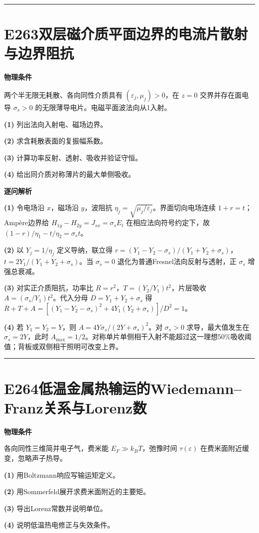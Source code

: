 \documentclass[UTF8,a4paper,11pt,oneside,openany]{ctexbook}
\begin{document}
\par\bigskip\hrule\bigskip
\section*{E263\quad 双层磁介质平面边界的电流片散射与边界阻抗}
\textbf{物理条件}\par 两个半无限无耗散、各向同性介质具有 \((\varepsilon_j,\mu_j)>0\)，在 \(z=0\) 交界并存在面电导 \(\sigma_s>0\) 的无限薄导电片。电磁平面波法向从1入射。
\par\noindent\textbf{(1)} 列出法向入射电、磁场边界。
\par\noindent\textbf{(2)} 求含耗散表面的复振幅系数。
\par\noindent\textbf{(3)} 计算功率反射、透射、吸收并验证守恒。
\par\noindent\textbf{(4)} 给出同介质对称薄片的最大单侧吸收。

\par\medskip\noindent\textbf{逐问解析}
\par\noindent\textbf{(1)} 令电场沿 \(x\)，磁场沿 \(y\)，波阻抗 \(\eta_j=\sqrt{\mu_j/\varepsilon_j}\)。界面切向电场连续 \(1+r=t\)；Ampère边界给 \(H_{1y}-H_{2y}=J_{sx}=\sigma_sE_t\) 在相应法向符号约定下，故 \((1-r)/\eta_1-t/\eta_2=\sigma_st\)。
\par\noindent\textbf{(2)} 以 \(Y_j=1/\eta_j\) 定义导纳，联立得 \(r=(Y_1-Y_2-\sigma_s)/(Y_1+Y_2+\sigma_s)\)，\(t=2Y_1/(Y_1+Y_2+\sigma_s)\)。当 \(\sigma_s=0\) 退化为普通Fresnel法向反射与透射，正 \(\sigma_s\) 增强总衰减。
\par\noindent\textbf{(3)} 对实正介质阻抗，功率比 \(R=r^2\)，\(T=(Y_2/Y_1)t^2\)，片层吸收 \(A=(\sigma_s/Y_1)t^2\)。代入分母 \(D=Y_1+Y_2+\sigma_s\) 得 \(R+T+A=[(Y_1-Y_2-\sigma_s)^2+4Y_1(Y_2+\sigma_s)]/D^2=1\)。
\par\noindent\textbf{(4)} 若 \(Y_1=Y_2=Y\)，则 \(A=4Y\sigma_s/(2Y+\sigma_s)^2\)。对 \(\sigma_s>0\) 求导，最大值发生在 \(\sigma_s=2Y\)，此时 \(A_{\max}=1/2\)。对称单片单侧相干入射不能超过这一理想50\%吸收阈值；背板或双侧相干照明可改变上界。

\par\bigskip\hrule\bigskip
\section*{E264\quad 低温金属热输运的Wiedemann–Franz关系与Lorenz数}
\textbf{物理条件}\par 各向同性三维简并电子气，费米能 \(E_F\gg k_BT\)，弛豫时间 \(\tau(\varepsilon)\) 在费米面附近缓变，忽略声子热导。
\par\noindent\textbf{(1)} 用Boltzmann响应写输运矩定义。
\par\noindent\textbf{(2)} 用Sommerfeld展开求费米面附近的主要矩。
\par\noindent\textbf{(3)} 导出Lorenz常数并说明单位。
\par\noindent\textbf{(4)} 说明低温热电修正与失效条件。
\end{document}
